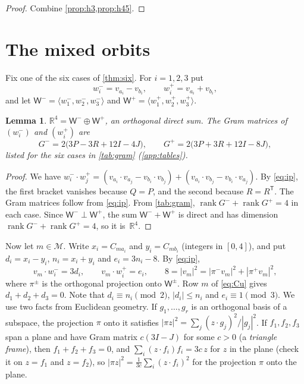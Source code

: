 \documentclass[11pt,a4paper]{amsart}
\newtheorem{lemma}[theorem]{Lemma}
\theoremstyle{definition}
\theoremstyle{remark}
\newcommand{\R}{\mathbb{R}}
\newcommand{\cM}{\mathcal{M}}
\newcommand{\T}{\mathsf{T}}
\newcommand{\rk}{\operatorname{rank}}
\newcommand{\Wm}{\mathsf{W}^{-}}
\newcommand{\Wp}{\mathsf{W}^{+}}
\begin{document}
\begin{proof}
Combine \cref{prop:h3,prop:h45}.
\end{proof}

\section{The mixed orbits}\label{sec:mixed}

Fix one of the six cases of \cref{thm:six}. For $i=1,2,3$ put
\[
w_i^-=v_{a_i}-v_{b_i},\qquad w_i^+=v_{a_i}+v_{b_i},
\]
and let $\Wm=\langle w_1^-,w_2^-,w_3^-\rangle$ and $\Wp=\langle w_1^+,w_2^+,w_3^+\rangle$.

\begin{lemma}\label{lem:split}
$\R^4=\Wm\oplus\Wp$, an orthogonal direct sum. The Gram matrices of $(w_i^-)$ and $(w_i^+)$ are
\[
G^-=2\bigl(3P-3R+12I-4J\bigr),\qquad G^+=2\bigl(3P+3R+12I-8J\bigr),
\]
listed for the six cases in \cref{tab:gram} (\cref{app:tables}).
\end{lemma}

\begin{proof}
We have $w_i^-\cdot w_j^+=(v_{a_i}\cdot v_{a_j}-v_{b_i}\cdot v_{b_j})+(v_{a_i}\cdot v_{b_j}-v_{b_i}\cdot v_{a_j})$.
By \eqref{eq:ip}, the first bracket vanishes because $Q=P$, and the second because $R=R^{\T}$. The Gram
matrices follow from \eqref{eq:ip}. From \cref{tab:gram}, $\rk G^-+\rk G^+=4$ in each case. Since $\Wm\perp\Wp$,
the sum $\Wm+\Wp$ is direct and has dimension $\rk G^-+\rk G^+=4$, so it is~$\R^4$.
\end{proof}

Now let $m\in\cM$. Write $x_i=C_{ma_i}$ and $y_i=C_{mb_i}$ (integers in $[0,4]$), and put $d_i=x_i-y_i$,
$n_i=x_i+y_i$ and $e_i=3n_i-8$. By \eqref{eq:ip},
\begin{equation}\label{eq:mixedip}
v_m\cdot w_i^-=3d_i,\qquad v_m\cdot w_i^+=e_i,\qquad 8=|v_m|^2=|\pi^-v_m|^2+|\pi^+v_m|^2,
\end{equation}
where $\pi^\pm$ is the orthogonal projection onto $\mathsf W^\pm$. Row $m$ of \eqref{eq:Cu} gives
$d_1+d_2+d_3=0$. Note that $d_i\equiv n_i\pmod 2$, $|d_i|\le n_i$ and $e_i\equiv1\pmod 3$. We use two
facts from Euclidean geometry. If $g_1,\dots,g_r$ is an orthogonal basis of a subspace, the projection
$\pi$ onto it satisfies $|\pi z|^2=\sum_j(z\cdot g_j)^2/|g_j|^2$. If $f_1,f_2,f_3$ span a plane and have Gram
matrix $c(3I-J)$ for some $c>0$ (a \emph{triangle frame}), then $f_1+f_2+f_3=0$, and
$\sum_i(z\cdot f_i)f_i=3c\,z$ for $z$ in the plane (check it on $z=f_1$ and $z=f_2$), so
$|\pi z|^2=\frac1{3c}\sum_i(z\cdot f_i)^2$ for the projection $\pi$ onto the plane.
\end{document}
